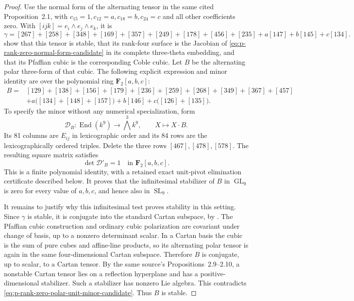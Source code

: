 \begin{proof}
Use the normal form of the alternating tensor in the same cited
Proposition~2.1, with $c_{15}=1,c_{12}=a,c_{18}=b,c_{24}=c$ and
all other coefficients zero. With $[ijk]=e_i\wedge e_j\wedge e_k$,
it is
\[
 \gamma=[267]+[258]+[348]+[169]+[357]+[249]+[178]+[456]
                 +[235]+a[147]+b[145]+c[134].
\]
\citet[Proposition~2.13 and Proposition~3.8, including their proofs]
{RainsSam2018Trivectors} show that this tensor is stable, that its
rank-four surface is the Jacobian of \eqref{eq:p-rank-zero-normal-form-candidate}
in its complete three-theta embedding, and that its Pfaffian cubic
is the corresponding Coble cubic. Let $B$ be the alternating polar
three-form of that cubic. The following explicit expression and
minor identity are over the polynomial ring $\mathbf F_2[a,b,c]$:
\begin{align*}
 B={}&[129]+[138]+[156]+[179]+[236]+[259]+[268]
                 +[349]+[367]+[457]\\
    &+a\bigl([134]+[148]+[157]\bigr)
                 +b[146]+c\bigl([126]+[135]\bigr).
\end{align*}
To specify the minor without any numerical specialization, form
\[
 \mathcal D_B:\operatorname{End}(k^9)\longrightarrow\bigwedge^3 k^9,
                   \qquad X\longmapsto X\cdot B.
\]
Its 81 columns are $E_{ij}$ in lexicographic order and its 84 rows
are the lexicographically ordered triples. Delete the three rows
$[467],[478],[578]$. The resulting square matrix satisfies
\begin{equation}\label{eq:p-rank-zero-polar-unit-minor-candidate}
                         \det\mathcal D'_B=1
                   \quad\text{in }\mathbf F_2[a,b,c].
\end{equation}
This is a finite polynomial identity, with a retained exact
unit-pivot elimination certificate described below. It proves that
the infinitesimal stabilizer of $B$ in $\operatorname{GL}_9$ is zero
for every value of $a,b,c$, and hence also in $\operatorname{SL}_9$.

It remains to justify why this infinitesimal test proves stability
in this setting. Since $\gamma$ is stable, it is conjugate into the
standard Cartan subspace, by
\citet[Corollary~5.6]{RainsSam2018Trivectors}.
The Pfaffian cubic construction and ordinary cubic polarization are
covariant under change of basis, up to a nonzero determinant scalar.
In a Cartan basis the cubic is the sum of pure cubes and affine-line
products, so its alternating polar tensor is again in the same
four-dimensional Cartan subspace. Therefore $B$ is conjugate, up
to scalar, to a Cartan tensor. By the same source's
Propositions~2.9--2.10, a nonstable Cartan tensor lies on a reflection
hyperplane and has a positive-dimensional stabilizer. Such a
stabilizer has nonzero Lie algebra. This contradicts
\eqref{eq:p-rank-zero-polar-unit-minor-candidate}. Thus $B$ is stable.
\end{proof}

